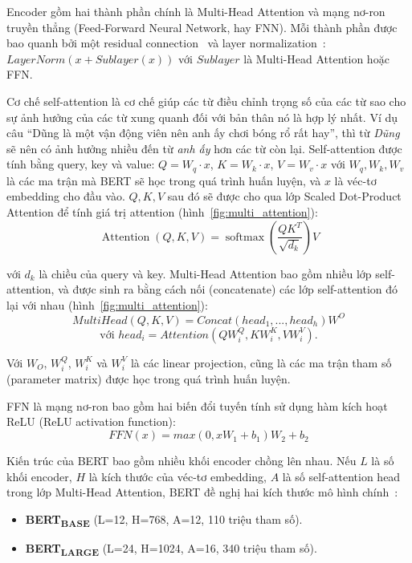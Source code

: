 
Encoder gồm hai thành phần chính là Multi-Head Attention và mạng nơ-ron truyền thẳng (Feed-Forward Neural Network, hay FNN). Mỗi thành phần được bao quanh bởi một residual connection~\cite{heDeepResidualLearning2016} và layer normalization~\cite{baLayerNormalization2016}: $LayerNorm(x + Sublayer(x))$ với $Sublayer$ là Multi-Head Attention hoặc FFN.

Cơ chế self-attention là cơ chế giúp các từ điều chỉnh trọng số của các từ sao cho sự ảnh hưởng của các từ xung quanh đối với bản thân nó là hợp lý nhất. Ví dụ câu ``Dũng là một vận động viên nên anh ấy chơi bóng rổ rất hay'', thì từ \textit{Dũng} sẽ nên có ảnh hưởng nhiều đến từ \textit{anh ấy} hơn các từ còn lại. Self-attention được tính bằng query, key và value: $Q = W_q \cdot x$, $K = W_k \cdot x$, $V = W_v \cdot x$ với $W_q, W_k, W_v$ là các ma trận mà BERT sẽ học trong quá trình huấn luyện, và $x$ là véc-tơ embedding cho đầu vào. $Q, K, V$ sau đó sẽ được cho qua lớp Scaled Dot-Product Attention để tính giá trị attention (hình~\ref{fig:multi_attention}):
\[ \operatorname{Attention}(Q, K, V)=\operatorname{softmax}\left(\frac{Q
K^{T}}{\sqrt{d_{k}}}\right) V \]

với $d_k$ là chiều của query và key. Multi-Head Attention bao gồm nhiều lớp self-attention, và được sinh ra bằng cách nối (concatenate) các lớp self-attention đó lại với nhau (hình~\ref{fig:multi_attention}):
\[ MultiHead(Q,K,V) = Concat(head_1,...,head_h)W^O \]
\[ \text{với } head_i = Attention(QW_i^Q, KW_i^K, VW_i^V). \]

Với $W_O$, $W_i^Q$, $W_i^K$ và $W_i^V$ là các linear projection, cũng là các ma trận tham số (parameter matrix) được học trong quá trình huấn luyện.


FFN là mạng nơ-ron bao gồm hai biến đổi tuyến tính sử dụng hàm kích hoạt ReLU (ReLU activation function):
\[ FFN(x) = max(0,xW_1 + b_1)W_2 + b_2 \]

Kiến trúc của BERT bao gồm nhiều khối encoder chồng lên nhau. Nếu $L$ là số khối encoder, $H$ là kích thước của véc-tơ embedding, $A$ là số self-attention head trong lớp Multi-Head Attention, BERT đề nghị hai kích thước mô hình
chính~\cite{devlinBERTPretrainingDeep2019}:
\begin{itemize}
	\item \textbf{BERT\textsubscript{BASE}} (L=12, H=768, A=12, 110 triệu tham số).
	\item \textbf{BERT\textsubscript{LARGE}} (L=24, H=1024, A=16, 340 triệu tham số).
\end{itemize}

